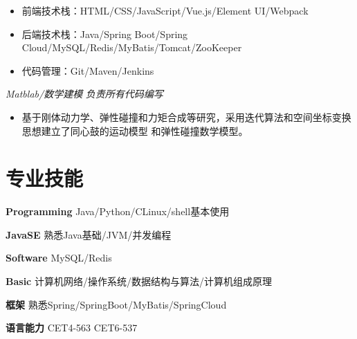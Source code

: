 \documentclass{uniquecv}
\begin{document}
{\it }
\vspace{0.4ex}
\begin{itemize}
  \item 前端技术栈：HTML/CSS/JavaScript/Vue.js/Element UI/Webpack
  \item 后端技术栈：Java/Spring Boot/Spring Cloud/MySQL/Redis/MyBatis/Tomcat/ZooKeeper
  \item 代码管理：Git/Maven/Jenkins
\end{itemize}

{\it Matblab/数学建模}
\quad \emph{负责所有代码编写}
\vspace{0.4ex}
\begin{itemize}
  \item 基于刚体动力学、弹性碰撞和力矩合成等研究，采用迭代算法和空间坐标变换思想建立了同心鼓的运动模型
和弹性碰撞数学模型。
\end{itemize}
\vspace{0.4ex}


\section{专业技能}
\smallskip
\textbf{Programming}
\quad Java/Python/C\quad Linux/shell基本使用

\textbf{JavaSE} 
\quad 熟悉Java基础/JVM/并发编程

\textbf{Software} 
\quad MySQL/Redis

\textbf{Basic} 
\quad 计算机网络/操作系统/数据结构与算法/计算机组成原理

\textbf{框架} 
\quad 熟悉Spring/SpringBoot/MyBatis/SpringCloud

\textbf{语言能力} 
\quad CET4-563 \quad CET6-537
\end{document}
